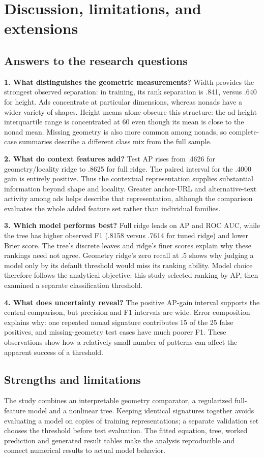 \documentclass[11pt,a4paper]{article}
\begin{document}
\section{Discussion, limitations, and extensions}
\subsection{Answers to the research questions}
\textbf{1. What distinguishes the geometric measurements?} Width provides the strongest observed separation: in training, its rank separation is .841, versus .640 for height. Ads concentrate at particular dimensions, whereas nonads have a wider variety of shapes. Height means alone obscure this structure: the ad height interquartile range is concentrated at 60 even though its mean is close to the nonad mean. Missing geometry is also more common among nonads, so complete-case summaries describe a different class mix from the full sample.

\textbf{2. What do context features add?} Test AP rises from .4626 for geometry/locality ridge to .8625 for full ridge. The paired interval for the .4000 gain is entirely positive. Thus the contextual representation supplies substantial information beyond shape and locality. Greater anchor-URL and alternative-text activity among ads helps describe that representation, although the comparison evaluates the whole added feature set rather than individual families.

\textbf{3. Which model performs best?} Full ridge leads on AP and ROC AUC, while the tree has higher observed F1 (.8158 versus .7614 for tuned ridge) and lower Brier score. The tree's discrete leaves and ridge's finer scores explain why these rankings need not agree. Geometry ridge's zero recall at .5 shows why judging a model only by its default threshold would miss its ranking ability. Model choice therefore follows the analytical objective: this study selected ranking by AP, then examined a separate classification threshold.

\textbf{4. What does uncertainty reveal?} The positive AP-gain interval supports the central comparison, but precision and F1 intervals are wide. Error composition explains why: one repeated nonad signature contributes 15 of the 25 false positives, and missing-geometry test cases have much poorer F1. These observations show how a relatively small number of patterns can affect the apparent success of a threshold.

\subsection{Strengths and limitations}
The study combines an interpretable geometry comparator, a regularized full-feature model and a nonlinear tree. Keeping identical signatures together avoids evaluating a model on copies of training representations; a separate validation set chooses the threshold before test evaluation. The fitted equation, tree, worked prediction and generated result tables make the analysis reproducible and connect numerical results to actual model behavior.
\end{document}

